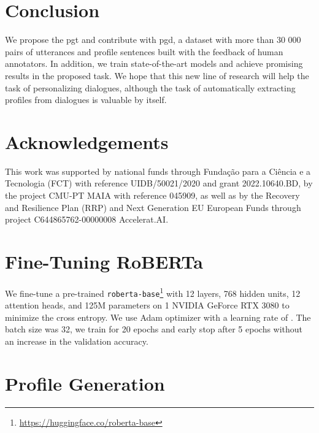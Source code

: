\documentclass[11pt]{article}
\begin{document}
\section{Conclusion}

We propose the \gls*{pgt} and contribute with \gls*{pgd}, a dataset with more than 30 000 pairs of utterances and profile sentences built with the feedback of human annotators. In addition, we train state-of-the-art models and achieve promising results in the proposed task. We hope that this new line of research will help the task of personalizing dialogues, although the task of automatically extracting profiles from dialogues is valuable by itself. 

\section*{Acknowledgements}
This work was supported by national funds through Fundação para a Ciência e a Tecnologia (FCT) with reference UIDB/50021/2020 and grant 2022.10640.BD, by the project CMU-PT MAIA with reference 045909, as well as by the Recovery and Resilience Plan (RRP) and Next Generation EU European Funds through project C644865762-00000008 Accelerat.AI.













\clearpage

\appendix

\section{Fine-Tuning RoBERTa}
\label{appendix:roberta-dnli}

We fine-tune a pre-trained \texttt{roberta-base}\footnote{\href{https://huggingface.co/roberta-base}{https://huggingface.co/roberta-base}} \cite{ROBERTA} with 12 layers, 768 hidden units, 12 attention heads, and 125M parameters on 1 NVIDIA GeForce RTX 3080 to minimize the cross entropy. We use Adam \cite{ADAM} optimizer with a learning rate of .
The batch size was 32, we train for 20 epochs and early stop after 5 epochs without an increase in the validation accuracy.



\section{Profile Generation}
\end{document}
